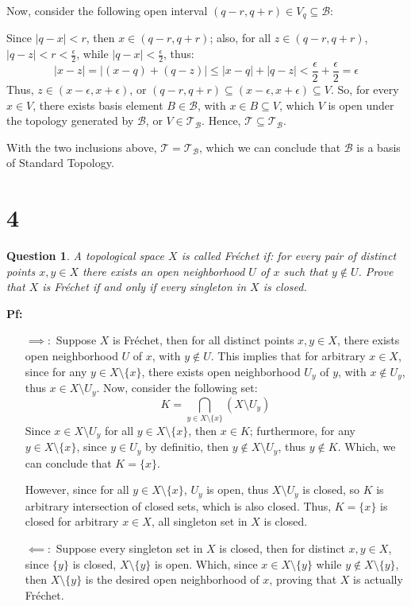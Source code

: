 \documentclass{article}
\newtheorem{question}{Question}
\begin{document}
Now, consider the following open interval $(q-r,q+r)\in V_q\subseteq \mathcal{B}$:

Since $|q-x|<r$, then $x\in (q-r,q+r)$; also, for all $z\in (q-r,q+r)$, $|q-z|<r<\frac{\epsilon}{2}$, while $|q-x|<\frac{\epsilon}{2}$, thus:
$$|x-z| = |(x-q)+(q-z)| \leq |x-q|+|q-z| < \frac{\epsilon}{2}+\frac{\epsilon}{2} = \epsilon$$
Thus, $z\in (x-\epsilon,x+\epsilon)$, or $(q-r,q+r)\subseteq(x-\epsilon,x+\epsilon)\subseteq V$.
So, for every $x\in V$, there exists basis element $B\in\mathcal{B}$, with $x\in B\subseteq V$, which $V$ is open under the topology generated by $\mathcal{B}$,
or $V\in \mathcal{T_B}$. Hence, $\mathcal{T}\subseteq \mathcal{T_B}$.

\hfill

With the two inclusions above, $\mathcal{T}=\mathcal{T_B}$, which we can conclude that $\mathcal{B}$ is a basis of Standard Topology.


\break

\section*{4}
\begin{question}
    A topological space $X$ is called Fréchet if: for every pair of distinct points 
    $x, y \in X$ there exists an open neighborhood $U$ of $x$ such that $y\notin U$. Prove that 
    $X$ is Fréchet if and only if every singleton in $X$ is closed.
\end{question}

\textbf{Pf:}
\begin{itemize}
    \item[$\implies:$]
    Suppose $X$ is Fréchet, then for all distinct points $x,y\in X$, there exists open neighborhood $U$ of $x$, with $y\notin U$.
    This implies that for arbitrary $x\in X$, since for any $y\in X\setminus\{x\}$, there exists open neighborhood $U_y$ of $y$, with $x\notin U_y$,
    thus $x\in X\setminus U_y$. Now, consider the following set:
    $$K=\bigcap_{y\in X\setminus\{x\}}(X\setminus U_y)$$
    Since $x\in X\setminus U_y$ for all $y\in X\setminus\{x\}$, then $x\in K$; furthermore, for any $y\in X\setminus\{x\}$, 
    since $y\in U_y$ by definitio, then $y\notin X\setminus U_y$, thus $y\notin K$. Which, we can conclude that $K=\{x\}$.

    However, since for all $y\in X\setminus\{x\}$, $U_y$ is open, thus $X\setminus U_y$ is closed, so $K$ is arbitrary intersection of closed sets, 
    which is also closed. Thus, $K=\{x\}$ is closed for arbitrary $x\in X$, all singleton set in $X$ is closed.
    

    \hfill

    \item[$\impliedby:$] 
    Suppose every singleton set in $X$ is closed, then for distinct $x,y\in X$, since $\{y\}$ is closed, $X\setminus\{y\}$ is open.
    Which, since $x\in X\setminus\{y\}$ while $y\notin X\setminus\{y\}$, then $X\setminus\{y\}$ is the desired open neighborhood of $x$, 
    proving that $X$ is actually Fréchet.

\end{itemize}
\end{document}

